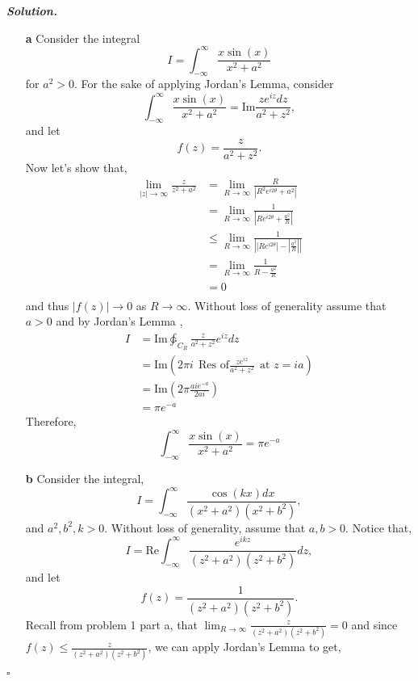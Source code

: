 \documentclass[12pt]{report}
\newenvironment{solution}[1][\it{Solution}]{\textbf{#1. } }{$\square$}
\def\ointcc{{\ointctrclockwise}}
\begin{document}
\begin{solution}
    \noindent
    \begin{enumerate}
        \item [{\bf a}]
        Consider the integral
        \[ I = \int_{-\infty}^{\infty} \frac{x\sin(x)}{x^2 + a^2}\]for $a^2 > 0$. For the sake of applying Jordan's Lemma, consider 
        \[
             \int_{-\infty}^{\infty} \frac{x\sin(x)}{x^2 + a^2} = \mathrm{Im} \frac{ze^{iz}dz}{a^2 + z^2},
        \] 
        and let 
        \[f(z) = \frac{z}{a^2 + z^2}.\]
        Now let's show that,
        \begin{align*}
            \lim_{|z| \rightarrow \infty}\frac{z}{z^2 + a^2} &= \lim_{R \rightarrow \infty} \frac{R}{|R^2e^{i2\theta} + a^2|}\\
            &=\lim_{R \rightarrow \infty} \frac{1}{\left|Re^{i2\theta} + \frac{a^2}{R}\right|}\\
            &\leq \lim_{R \rightarrow \infty} \frac{1}{\left| |Re^{i2\theta}| - |\frac{a^2}{R}| \right|}\\
            &= \lim_{R \rightarrow \infty} \frac{1}{R - \frac{a^2}{R}}\\
            &= 0\\
        \end{align*}
        and thus $|f(z)| \rightarrow 0$ as $R \rightarrow \infty$. Without loss of generality assume that $a>0$ and by Jordan's Lemma ,
        \begin{align*}
            I &= \mathrm{Im} \ointcc_{C_R} \frac{z}{a^2 + z^2}e^{iz}dz\\
            &= \mathrm{Im} (2\pi i ~~ \text{Res of} \frac{ze^{iz}}{a^2 + z^2} ~~ \text{at } z= ia)\\
            &= \mathrm{Im} (2 \pi \frac{aie^{-a}}{2ai})\\
            &= \pi e^{-a}
        \end{align*}
        Therefore,
        \[
            \int_{-\infty}^{\infty} \frac{x\sin(x)}{x^2 + a^2} = \pi e^{-a}
        \]
        \item [{\bf b}]
        Consider the integral,
        \[ 
            I = \int_{-\infty}^{\infty} \frac{\cos(kx)dx}{(x^2 + a^2)(x^2 + b^2)}, 
        \]
        and $a^2,b^2,k > 0$. Without loss of generality, assume that $a,b>0$. Notice that,
        \[ 
            I = \mathrm{Re} \int_{-\infty}^{\infty} \frac{e^{ikz}}{(z^2 + a^2)(z^2 + b^2)}dz,
        \]
        and let
        \[ 
            f(z) = \frac{1}{(z^2 + a^2)(z^2 + b^2)}.
        \]
        Recall from problem 1 part a, that $\lim_{R \rightarrow \infty} \frac{z}{(z^2 + a^2)(z^2 + b^2)} = 0$ and since $f(z) \leq \frac{z}{(z^2 + a^2)(z^2 + b^2)}$, we can apply Jordan's Lemma to get,

\end{enumerate}
\end{solution}
\end{document}
